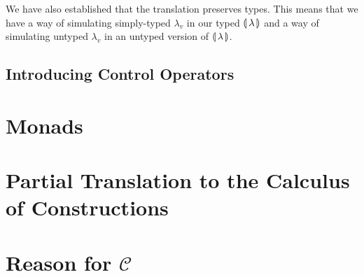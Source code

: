 We have also established that the translation preserves types. This means
that we have a way of simulating simply-typed $\lambda_v$ in our typed
$\llparenthesis \, \lambda \, \rrparenthesis$ and a way of simulating untyped $\lambda_v$ in an
untyped version of $\llparenthesis \, \lambda \, \rrparenthesis$.

\subsection{Introducing Control Operators}




\section{Monads}
\label{sec:monads}


\section{Partial Translation to the Calculus of Constructions}
\label{sec:translation-to-coc}


\section{Reason for $\mathcal{C}$}
\label{sec:reason-for-c}


